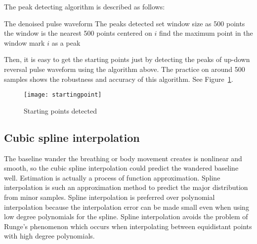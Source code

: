 The peak detecting algorithm is described as follows:

\begin{algorithmic}
    \REQUIRE The denoised pulse waveform
    \ENSURE The peaks detected
    \STATE set window size as 500 points
        \STATE the window is the nearest 500 points centered on $i$
        \STATE find the maximum point in the window 
            \STATE mark $i$ as a peak
        \ENDIF
    \ENDFOR
\end{algorithmic}

Then, it is easy to get the starting points just by detecting the peaks of
up-down reversal pulse waveform using the algorithm above. The
practice on around 500 samples shows the robustness and accuracy of
this algorithm. See Figure~\ref{fig:startingpoint}.
\begin{figure}[htpb]
    \begin{center}
        \texttt{[image: startingpoint]}
    \end{center}
    \caption{Starting points detected}
    \label{fig:startingpoint}
\end{figure}

\subsection{Cubic spline interpolation}
The baseline wander the breathing or body movement creates is
nonlinear and smooth, so the cubic spline interpolation could predict
the wandered baseline well. Estimation is actually a process of
function approximation. Spline interpolation is such an approximation
method to predict the major distribution from minor samples. Spline
interpolation is preferred over polynomial interpolation because the
interpolation error can be made small even when using low degree
polynomials for the spline. Spline interpolation avoids the problem of
Runge's phenomenon which occurs when interpolating between equidistant
points with high degree polynomials. 

